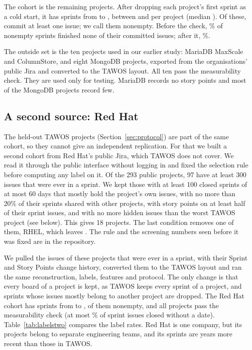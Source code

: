 \documentclass[journal]{IEEEtran}
\begin{document}
The cohort is the remaining \NProj{} projects. After dropping each project's first sprint as a cold start, it has \NSprints{} sprints from \DateFrom{} to \DateTo, between \SprintMin{} and \SprintMax{} per project (median \SprintMed). Of these, \NNonempty{} commit at least one issue; we call them nonempty. Before the check, \FullNothingPct\% of nonempty sprints finished none of their committed issues; after it, \CleanNothingPct\%.

The outside set is the ten projects used in our earlier study: MariaDB MaxScale and ColumnStore, and eight MongoDB projects, exported from the organisations' public Jira and converted to the TAWOS layout. All ten pass the measurability check. They are used only for testing. MariaDB records no story points and most of the MongoDB projects record few.

\subsection{A second source: Red Hat}
\label{sec:redhat}

The \ConfProj{} held-out TAWOS projects (Section~\ref{sec:protocol}) are part of the same cohort, so they cannot give an independent replication. For that we built a second cohort from Red Hat's public Jira, which TAWOS does not cover. We read it through the public interface without logging in and fixed the selection rule before computing any label on it. Of the 293 public projects, 97 have at least 300 issues that were ever in a sprint. We kept those with at least 100 closed sprints of at most 60 days that mostly hold the project's own issues, with no more than 20\% of their sprints shared with other projects, with story points on at least half of their sprint issues, and with no more hidden issues than the worst TAWOS project (see below). This gives 18 projects. The last condition removes one of them, RHEL, which leaves \RHProj. The rule and the screening numbers seen before it was fixed are in the repository.

We pulled the \RHIssues{} issues of these projects that were ever in a sprint, with their Sprint and Story Points change history, converted them to the TAWOS layout and ran the same reconstruction, labels, features and protocol. The only change is that every board of a project is kept, as TAWOS keeps every sprint of a project, and sprints whose issues mostly belong to another project are dropped. The Red Hat cohort has \RHSprints{} sprints from \RHFrom{} to \RHTo, \RHNonempty{} of them nonempty, and all \RHProj{} projects pass the measurability check (at most \RHUnrecMax\% of sprint issues closed without a date). Table~\ref{tab:labelstwo} compares the label rates. Red Hat is one company, but its projects belong to separate engineering teams, and its sprints are years more recent than those in TAWOS.
\end{document}
